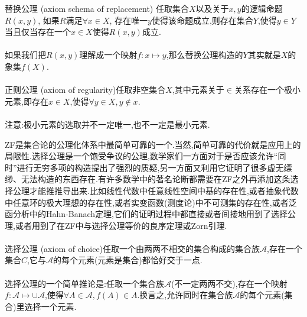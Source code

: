 \documentclass[12pt]{article}
\newcommand{\myind}[1]{{\upshape\color{blue} #1 }\index{#1}}
\begin{document}
\myind{替换公理}(axiom schema of replacement) 任取集合$X$以及关于$x,y$的逻辑命题$R(x,y)$, 如果$R$满足$\forall x\in X$, 存在唯一$y$使得该命题成立,则存在集合$Y$,使得$y\in Y$当且仅当存在一个$x\in X$使得$R(x,y)$成立.
\\ \hspace*{\fill} \\%
如果我们把$R(x,y)$理解成一个映射$f:x\mapsto y$,那么替换公理构造的$Y$其实就是$X$的象集$f(X)$.
\\ \hspace*{\fill} \\%
\myind{正则公理}(axiom of regularity)任取非空集合$X$,其中元素关于$\in$关系存在一个极小元素,即存在$x\in X$,使得$\forall y\in X,y\notin x$.
\\ \hspace*{\fill} \\%
注意:极小元素的选取并不一定唯一,也不一定是最小元素.

ZF是集合论的公理化体系中最简单可靠的一个.当然,简单可靠的代价就是应用上的局限性.选择公理是一个饱受争议的公理,数学家们一方面对于是否应该允许“同时”进行无穷多项的构造提出了强烈的质疑,另一方面又利用它证明了很多虚无缥缈、无法构造的东西存在.有许多数学中的著名论断都需要在ZF之外再添加这条选择公理才能推推导出来.比如线性代数中任意线性空间中基的存在性,或者抽象代数中任意环的极大理想的存在性,或者实变函数(测度论)中不可测集的存在性,或者泛函分析中的Hahn-Banach定理,它们的证明过程中都直接或者间接地用到了选择公理,或者用到了在ZF中与选择公理等价的良序定理或Zorn引理.
\\ \hspace*{\fill} \\%
\myind{选择公理}(axiom of choice)任取一个由两两不相交的集合构成的集合族$\mathcal{A}$,存在一个集合$C$,它与$\mathcal{A}$的每个元素(元素是集合)都恰好交于一点.
\\ \hspace*{\fill} \\%
选择公理的一个简单推论是:任取一个集合族$\mathcal{A}$(不一定两两不交),存在一个映射$f:\mathcal{A}\mapsto\cup\mathcal{A}$,使得$\forall A\in\mathcal{A},f(A)\in A$.换言之,允许同时在集合族$\mathcal{A}$的每个元素(集合)里选择一个元素.

\end{document}
